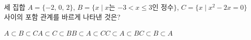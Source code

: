 세 집합 $A=\{-2,\,0,\,2\}$, $B=\{x \mid x$는 $-3<x\le 3$인 정수$\}$, $C=\{x \mid x^2-2x=0\}$ 사이의 포함 관계를 바르게 나타낸 것은?
\begin{choices32}{$A\subset B\subset C$}{$A\subset C\subset B$}{$B\subset A\subset C$}{$C\subset A\subset B$}{$C\subset B\subset A$}\end{choices32}
